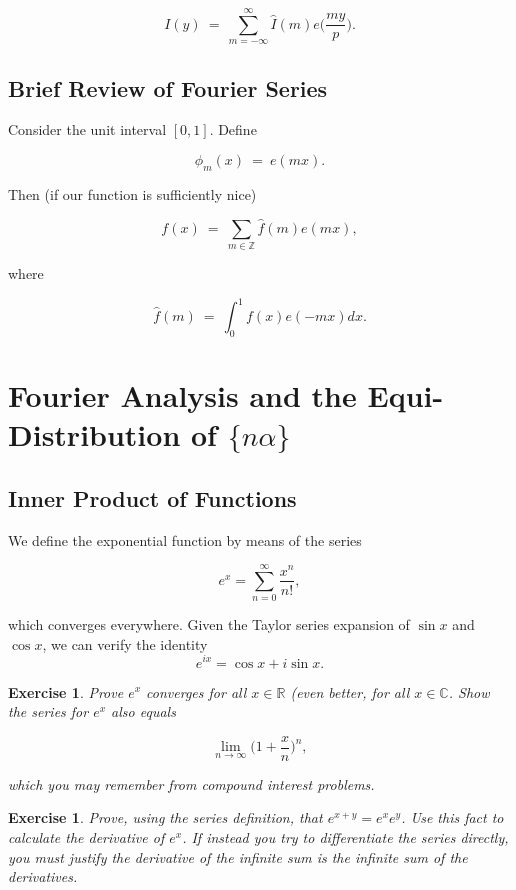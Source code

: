 \documentclass[12pt,letterpaper]{report}
\newcommand\be{\begin{equation}}
\newcommand\ee{\end{equation}}
\newcommand{\R}{\ensuremath{\mathbb{R}}}
\newcommand{\C}{\ensuremath{\mathbb{C}}}
\newcommand{\Z}{\ensuremath{\mathbb{Z}}}
\newtheorem{exe}[thm]{Exercise}
\begin{document}
\be I(y) \ = \ \sum_{m=-\infty}^\infty \widehat{I}(m)
e\Big(\frac{my}{p}\Big). \ee


\subsection{Brief Review of Fourier Series}

Consider the unit interval $[0,1]$. Define

\be \phi_m(x) \ = \ e(mx). \ee

Then (if our function is sufficiently nice)

\be f(x) \ = \ \sum_{m \in \Z} \widehat{f}(m) e(mx), \ee

where

\be \widehat{f}(m) \ = \ \int_0^1 f(x)e(-mx)dx. \ee















\section{Fourier Analysis and the Equi-Distribution of
$\{n\alpha\}$}

\subsection{Inner Product of Functions}

We define the exponential function by means of the series

\be e^x = \sum_{n=0}^\infty \frac{x^n}{n!},\ee

which converges everywhere. Given the Taylor series expansion of
$\sin x$ and $\cos x$, we can verify the identity \be e^{i x} =
\cos x + i \sin x.\ee

\begin{exe} Prove $e^x$ converges for all $x \in \R$ (even better,
for all $x \in \C$. Show the series for $e^x$ also equals

\be \lim_{n \rightarrow \infty} \Big(1 + \frac{x}{n} \Big)^n, \ee

which you may remember from compound interest problems. \end{exe}

\begin{exe} Prove, using the series definition, that $e^{x+y} =
e^x e^y$. Use this fact to calculate the derivative of $e^x$. If
instead you try to differentiate the series directly, you must
justify the derivative of the infinite sum is the infinite sum of
the derivatives. \end{exe}
\end{document}
